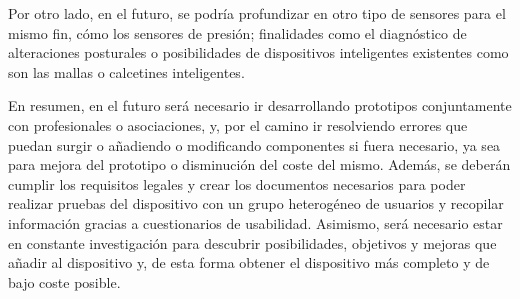 Por otro lado, en el futuro, se podría profundizar en otro tipo de sensores para el mismo fin, cómo los sensores de presión; finalidades como el diagnóstico de alteraciones posturales o posibilidades de dispositivos inteligentes existentes como son las mallas o calcetines inteligentes. 

En resumen, en el futuro será necesario ir desarrollando prototipos conjuntamente con profesionales o asociaciones, y, por el camino ir resolviendo errores que puedan surgir o añadiendo o modificando componentes si fuera necesario, ya sea para mejora del prototipo o disminución del coste del mismo. Además, se deberán cumplir los requisitos legales y crear los documentos necesarios para poder realizar pruebas del dispositivo con un grupo heterogéneo de usuarios y recopilar información gracias a cuestionarios de usabilidad. Asimismo, será necesario estar en constante investigación para descubrir posibilidades, objetivos y mejoras que añadir al dispositivo y, de esta forma obtener el dispositivo más completo y de bajo coste posible.

